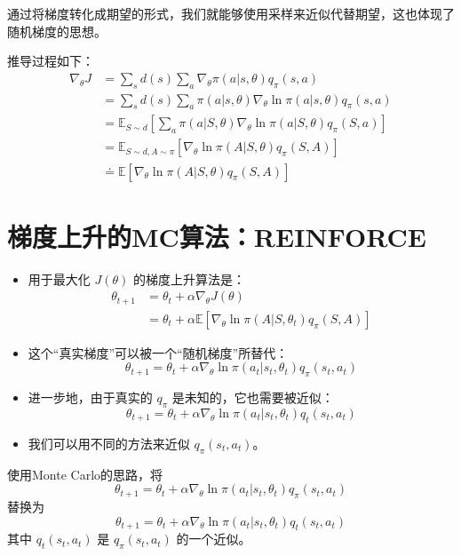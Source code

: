 \documentclass{article}
\begin{document}
通过将梯度转化成期望的形式，我们就能够使用采样来近似代替期望，这也体现了随机梯度的思想。

推导过程如下：
\begin{align*}
    \nabla_{\theta} J &= \sum_s d(s) \sum_a \nabla_{\theta} \pi(a|s, \theta) q_{\pi}(s, a) \\
    &= \sum_s d(s) \sum_a \pi(a|s, \theta) \nabla_{\theta} \ln \pi(a|s, \theta) q_{\pi}(s, a) \\
    &= \mathbb{E}_{S \sim d} \left[ \sum_a \pi(a|S, \theta) \nabla_{\theta} \ln \pi(a|S, \theta) q_{\pi}(S, a) \right] \\
    &= \mathbb{E}_{S \sim d, A \sim \pi} \left[ \nabla_{\theta} \ln \pi(A|S, \theta) q_{\pi}(S, A) \right] \\
    &\doteq \mathbb{E} \left[ \nabla_{\theta} \ln \pi(A|S, \theta) q_{\pi}(S, A) \right]
\end{align*}
\section{梯度上升的MC算法：REINFORCE}
\begin{itemize}
    \item 用于最大化 $J(\theta)$ 的梯度上升算法是：
    \begin{align*}
        \theta_{t+1} &= \theta_t + \alpha \nabla_{\theta} J(\theta) \\
        &= \theta_t + \alpha \mathbb{E}[\nabla_{\theta} \ln \pi(A|S, \theta_t) q_{\pi}(S, A)]
    \end{align*}
    
    \item 这个“真实梯度”可以被一个“随机梯度”所替代：
    \[
    \theta_{t+1} = \theta_t + \alpha \nabla_{\theta} \ln \pi(a_t|s_t, \theta_t) q_{\pi}(s_t, a_t)
    \]
    
    \item 进一步地，由于真实的 $q_{\pi}$ 是未知的，它也需要被近似：
    \[
    \theta_{t+1} = \theta_t + \alpha \nabla_{\theta} \ln \pi(a_t|s_t, \theta_t) q_t(s_t, a_t)
    \]
    
    \item 我们可以用不同的方法来近似 $q_{\pi}(s_t, a_t)$。
\end{itemize}
使用Monte Carlo的思路，将
\[
\theta_{t+1} = \theta_t + \alpha \nabla_{\theta} \ln \pi(a_t|s_t, \theta_t) q_{\pi}(s_t, a_t)
\]
替换为
\[
\theta_{t+1} = \theta_t + \alpha \nabla_{\theta} \ln \pi(a_t|s_t, \theta_t) q_t(s_t, a_t)
\]
其中 $q_t(s_t, a_t)$ 是 $q_{\pi}(s_t, a_t)$ 的一个近似。
\end{document}
